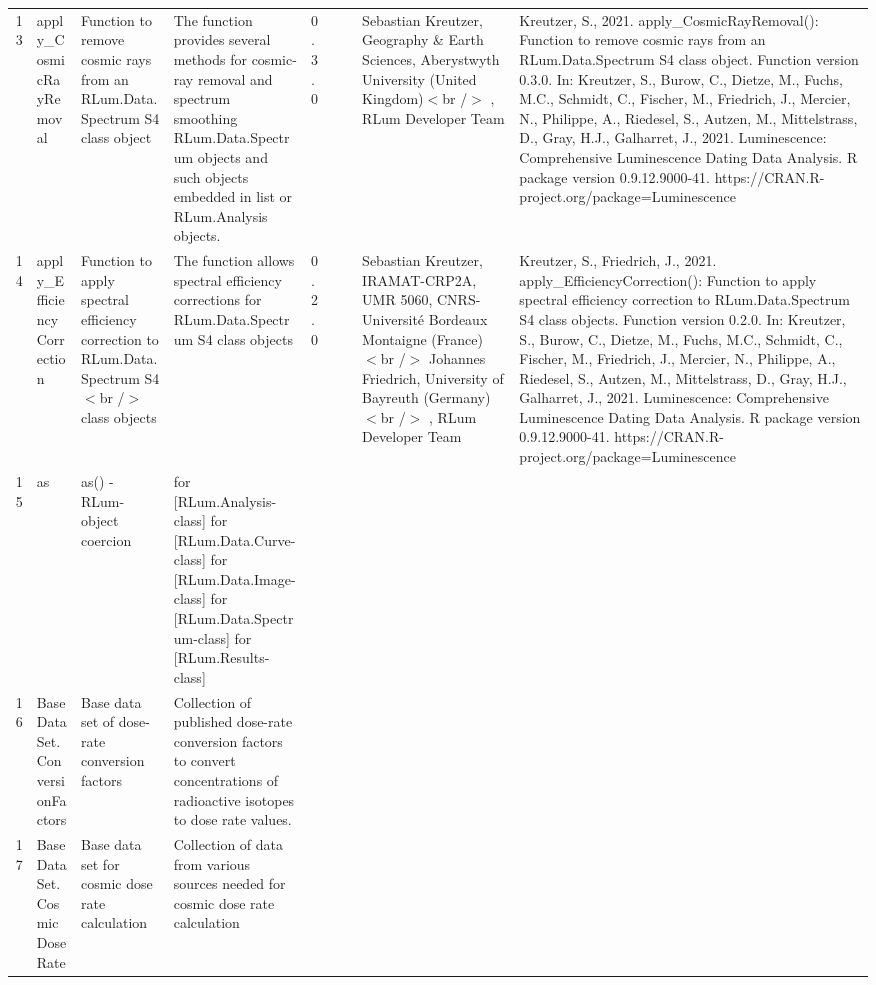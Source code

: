 \begin{table}[ht]
\begin{tabular}{rllllllll}
 \\ 
  13 & apply\_CosmicRayRemoval & Function to remove cosmic rays from an RLum.Data.Spectrum S4 class object & The function provides several methods for cosmic-ray removal and spectrum smoothing  RLum.Data.Spectrum  objects and such objects embedded in  list  or RLum.Analysis  objects. & 0.3.0
 &  &  & Sebastian Kreutzer, Geography \& Earth Sciences, Aberystwyth University (United Kingdom)$<$br /$>$ , RLum Developer Team & Kreutzer, S., 2021. apply\_CosmicRayRemoval(): Function to remove cosmic rays from an RLum.Data.Spectrum S4 class object. Function version 0.3.0. In: Kreutzer, S., Burow, C., Dietze, M., Fuchs, M.C., Schmidt, C., Fischer, M., Friedrich, J., Mercier, N., Philippe, A., Riedesel, S., Autzen, M., Mittelstrass, D., Gray, H.J., Galharret, J., 2021. Luminescence: Comprehensive Luminescence Dating Data Analysis. R package version 0.9.12.9000-41. https://CRAN.R-project.org/package=Luminescence
 \\ 
  14 & apply\_EfficiencyCorrection & Function to apply spectral efficiency correction to RLum.Data.Spectrum S4$<$br /$>$ class objects & The function allows spectral efficiency corrections for RLum.Data.Spectrum S4 class objects & 0.2.0
 &  &  & Sebastian Kreutzer, IRAMAT-CRP2A, UMR 5060, CNRS-Université Bordeaux Montaigne (France) $<$br /$>$ Johannes Friedrich, University of Bayreuth (Germany)$<$br /$>$ , RLum Developer Team & Kreutzer, S., Friedrich, J., 2021. apply\_EfficiencyCorrection(): Function to apply spectral efficiency correction to RLum.Data.Spectrum S4 class objects. Function version 0.2.0. In: Kreutzer, S., Burow, C., Dietze, M., Fuchs, M.C., Schmidt, C., Fischer, M., Friedrich, J., Mercier, N., Philippe, A., Riedesel, S., Autzen, M., Mittelstrass, D., Gray, H.J., Galharret, J., 2021. Luminescence: Comprehensive Luminescence Dating Data Analysis. R package version 0.9.12.9000-41. https://CRAN.R-project.org/package=Luminescence
 \\ 
  15 & as & as() - RLum-object coercion & for  [RLum.Analysis-class]   for  [RLum.Data.Curve-class]   for  [RLum.Data.Image-class]   for  [RLum.Data.Spectrum-class]   for  [RLum.Results-class] &  &  &  &  &  \\ 
  16 & BaseDataSet.ConversionFactors & Base data set of dose-rate conversion factors & Collection of published dose-rate conversion factors to convert concentrations of radioactive isotopes to dose rate values. &  &  &  &  &  \\ 
  17 & BaseDataSet.CosmicDoseRate & Base data set for cosmic dose rate calculation & Collection of data from various sources needed for cosmic dose rate calculation &  &  &  &  &  \\ 

\end{tabular}
\end{table}
